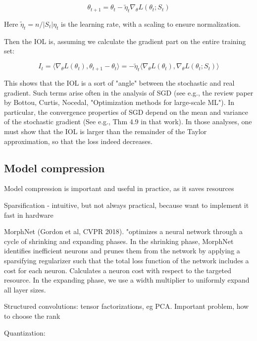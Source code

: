 \documentclass[english]{article}
\begin{document}
$$\theta_{t+1} = \theta_{t} - \tilde\eta_t \nabla_\theta L(\theta_{t};S_t)$$

Here $\tilde\eta_t = n/|S_t|\eta_t$ is the learning rate, with a scaling to ensure normalization. 

Then the IOL is, assuming we calculate the gradient part on the entire training set: 

$$I_t = 
\langle\nabla_\theta L(\theta_{t} ), \theta_{t+1} - \theta_{t} 
\rangle
=
- \tilde\eta_t 
\langle\nabla_\theta L(\theta_{t} ), \nabla_\theta L(\theta_{t};S_t)
\rangle 
$$

This shows that the IOL is a sort of "angle" between the stochastic and real gradient. Such terms arise often in the analysis of SGD (see e.g., the review paper by Bottou, Curtis, Nocedal, "Optimization methods for large-scale ML"). In particular, the convergence properties of SGD depend on the mean and variance of the stochastic gradient (See e.g., Thm 4.9 in that work). In those analyses, one must show that the IOL is larger than the remainder of the Taylor approximation, so that the loss indeed decreases. 

\eenum 



\subsection{Model compression}


\benum 
\item Model compression is important and useful in practice, as it saves resources

\item Sparsification - intuitive, but not always practical, because want to implement it fast in hardware 

MorphNet (Gordon et al, CVPR 2018). "optimizes a neural network through a cycle of shrinking and expanding phases. In the shrinking phase, MorphNet identifies inefficient neurons and prunes them from the network by applying a sparsifying regularizer such that the total loss function of the network includes a cost for each neuron. Calculates a neuron cost with respect to the targeted resource. In the expanding phase, we use a width multiplier to uniformly expand all layer sizes. 

\item Structured convolutions: tensor factorizations, eg PCA. Important problem, how to choose the rank

\item Quantization:
\end{document}
